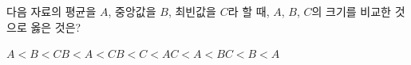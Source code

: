 다음 자료의 평균을 $A$, 중앙값을 $B$, 최빈값을 $C$라 할 때, $A$, $B$, $C$의 크기를 비교한 것으로 옳은 것은?
\begin{choices32}{$A<B<C$}{$B<A<C$}{$B<C<A$}{$C<A<B$}{$C<B<A$}\end{choices32}
